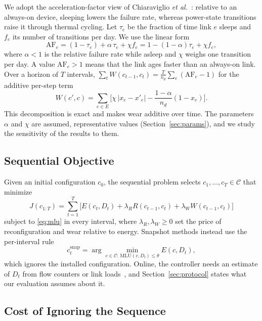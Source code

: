 \documentclass[journal]{IEEEtran}
\begin{document}
We adopt the acceleration-factor view of Chiaraviglio \emph{et al.}~\cite{chiaraviglio2015lifetime}: relative to an always-on device, sleeping lowers the failure rate, whereas power-state transitions raise it through thermal cycling. Let $\tau_e$ be the fraction of time link $e$ sleeps and $f_e$ its number of transitions per day. We use the linear form
\begin{equation}\label{eq:af}
\mathrm{AF}_e=(1-\tau_e)+\alpha\,\tau_e+\chi f_e=1-(1-\alpha)\tau_e+\chi f_e,
\end{equation}
where $\alpha<1$ is the relative failure rate while asleep and $\chi$ weighs one transition per day. A value $\mathrm{AF}_e>1$ means that the link ages faster than an always-on link. Over a horizon of $T$ intervals, $\sum_{t}W(c_{t-1},c_t)=\frac{T}{n_d}\sum_e(\mathrm{AF}_e-1)$ for the additive per-step term
\begin{equation}\label{eq:wear}
W(c',c)=\sum_{e\in E}\Big[\chi\,|x_e-x'_e|-\frac{1-\alpha}{n_d}(1-x_e)\Big].
\end{equation}
This decomposition is exact and makes wear additive over time. The parameters $\alpha$ and $\chi$ are assumed, representative values (Section~\ref{sec:params}), and we study the sensitivity of the results to them.

\subsection{Sequential Objective}

Given an initial configuration $c_0$, the sequential problem selects $c_1,\dots,c_T\in\mathcal{C}$ that minimize
\begin{equation}\label{eq:objective}
J(c_{1:T})=\sum_{t=1}^{T}\Big[E(c_t,D_t)+\lambda_R R(c_{t-1},c_t)+\lambda_W W(c_{t-1},c_t)\Big]
\end{equation}
subject to \eqref{eq:mlu} in every interval, where $\lambda_R,\lambda_W\ge0$ set the price of reconfiguration and wear relative to energy. Snapshot methods instead use the per-interval rule
\begin{equation}\label{eq:snapshot}
c^{\mathrm{snap}}_t=\arg\min_{c\in\mathcal{C}:\,\mathrm{MLU}(c,D_t)\le\theta}E(c,D_t),
\end{equation}
which ignores the installed configuration. Online, the controller needs an estimate of $D_t$ from flow counters or link loads~\cite{zhang2003tomogravity}, and Section~\ref{sec:protocol} states what our evaluation assumes about it.

\subsection{Cost of Ignoring the Sequence}
\end{document}
